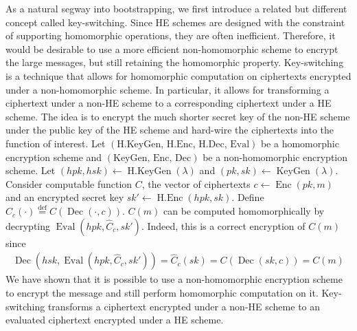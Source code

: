 As a natural segway into bootstrapping, we first introduce a related but different concept called key-switching. Since HE schemes are designed with the constraint of supporting homomorphic operations, they are often inefficient. Therefore, it would be desirable to use a more efficient non-homomorphic scheme to encrypt the large messages, but still retaining the homomorphic property. Key-switching is a technique that allows for homomorphic computation on ciphertexts encrypted under a non-homomorphic scheme. In particular, it allows for transforming a ciphertext under a non-HE scheme to a corresponding ciphertext under a HE scheme. The idea is to encrypt the much shorter secret key of the non-HE scheme under the public key of the HE scheme and hard-wire the ciphertexts into the function of interest. 
Let $(\text{H.KeyGen, H.Enc, H.Dec, Eval})$ be a homomorphic encryption scheme and $(\text{KeyGen, Enc, Dec})$ be a non-homomorphic encryption scheme. Let $(hpk,hsk) \leftarrow \operatorname{H.KeyGen}(\lambda)$ and $(pk,sk) \leftarrow \operatorname{KeyGen}(\lambda)$. Consider computable function $C$, the vector of ciphertexts $c \leftarrow \operatorname{Enc}(pk,m)$ and an encrypted secret key $sk' \leftarrow \operatorname{H.Enc}(hpk,sk)$. Define $\hat{C}_c(\cdot) \stackrel{\mathrm{def}}{=} C(\operatorname{Dec}(\cdot, c))$. $C(m)$ can be computed homomorphically by decrypting $\operatorname{Eval}(hpk,\hat{C}_c, sk')$. Indeed, this is a correct encryption of $C(m)$ since
\begin{equation*}
    \begin{aligned}
        \operatorname{Dec}(hsk,\operatorname{Eval}(hpk,\hat{C}_c, sk')) = \hat{C}_c(sk) = C(\operatorname{Dec}(sk, c)) = C(m)
    \end{aligned}
\end{equation*}
We have shown that it is possible to use a non-homomorphic encryption scheme to encrypt the message and still perform homomorphic computation on it. Key-switching transforms a ciphertext encrypted under a non-HE scheme to an evaluated ciphertext encrypted under a HE scheme.

